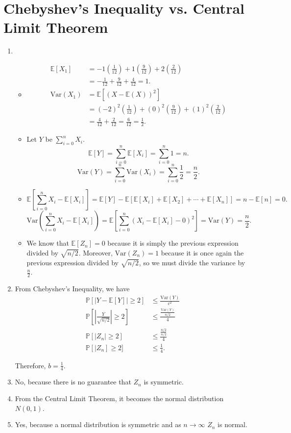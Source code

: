 \documentclass{article}
\newcommand{\p}{\mathbb{P}}
\newcommand{\ex}{\mathbb{E}}
\newcommand{\Var}{\text{Var}}
\begin{document}
\section{Chebyshev's Inequality vs. Central Limit Theorem}
\begin{enumerate}[label=(\alph*)]
\item 
\begin{itemize}
\item 
\begin{align*}
\ex[X_1] &= -1\left(\frac{1}{12}\right) + 1 \left(\frac{9}{12}\right) + 2 \left(\frac{2}{12}\right) \\
&= -\frac{1}{12} + \frac{9}{12} + \frac{4}{12} = \boxed{1}.\\
\Var(X_1) &= \ex[(X-\ex(X))^2] \\
&= (-2)^2 \left(\frac{1}{12}\right) + (0)^2 \left(\frac{9}{12}\right) + (1)^2 \left(\frac{2}{12}\right) \\
&= \frac{4}{12} + \frac{2}{12} = \frac{6}{12} = \boxed{\frac{1}{2}}.
\end{align*}
\item Let $Y$ be $\sum_{i=0}^n X_i$.
\[\ex[Y] = \sum_{i = 0}^n \ex[X_i] = \sum_{i=0}^n 1 = \boxed{n}. \]
\[\Var(Y) = \sum_{i = 0}^n \Var(X_i) = \sum_{i=0}^n \frac{1}{2} = \boxed{\frac{n}{2}}.\]
\item 
\[\ex\left[\sum_{i=0}^n X_i - \ex[X_i]\right] = \ex[Y] - \ex[\ex[X_i] + \ex[X_2] + \cdots + \ex[X_n]] = n - \ex[n] = \boxed{0}.\]
\[\Var\left(\sum_{i=0}^n X_i - \ex[X_i]\right) = \ex\left[\sum_{i=0}^n (X_i - \ex[X_i] - 0)^2\right] = \Var(Y) = \boxed{\frac{n}{2}}.\]
\item We know that $\ex[Z_n] = 0$ because it is simply the previous expression divided by $\sqrt{n/2}$. Moreover, $\Var(Z_n) = 1$ because it is once again the previous expression divided by $\sqrt{n/2}$, so we must divide the variance by $\frac{n}{2}$.
\end{itemize}
\item From Chebyshev's Inequality, we have
\begin{align*}
\p[|Y - \ex[Y]| \geq 2] &\leq \frac{\Var(Y)}{c^2} \\
\p\left[\left|\frac{Y}{\sqrt{n/2}}\right| \geq 2\right] &\leq \frac{\frac{\Var(Y)}{n/2}}{4} \\
\p[|Z_n| \geq 2] &\leq \frac{\frac{n/2}{n/2}}{4} \\
\p[|Z_n] \geq 2] &\leq \frac{1}{4}. 
\end{align*}

Therefore, $b = \boxed{\frac{1}{4}}$.
\item No, because there is no guarantee that $Z_n$ is symmetric.
\item From the Central Limit Theorem, it becomes the normal distribution $N(0, 1)$.
\item Yes, because a normal distribution is symmetric and as $n \to \infty$ $Z_n$ is normal.
\end{enumerate}
\end{document}
